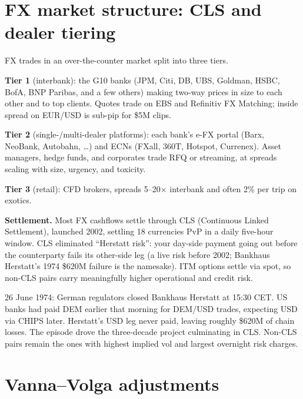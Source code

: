 \section{FX market structure: CLS and dealer tiering}
\label{sec:fx_market_structure}

FX trades in an over-the-counter market split into three tiers.

\textbf{Tier 1} (interbank): the G10 banks (JPM, Citi, DB, UBS,
Goldman, HSBC, BofA, BNP Paribas, and a few others) making two-way
prices in size to each other and to top clients.  Quotes trade on
EBS and Refinitiv FX Matching; inside spread on EUR/USD is sub-pip
for \$5M clips.

\textbf{Tier 2} (single-/multi-dealer platforms): each bank's
e-FX portal (Barx, NeoBank, Autobahn, \ldots) and ECNs (FXall, 360T,
Hotspot, Currenex).  Asset managers, hedge funds, and corporates
trade RFQ or streaming, at spreads scaling with size, urgency, and
toxicity.

\textbf{Tier 3} (retail): CFD brokers, spreads 5--20$\times$
interbank and often 2\% per trip on exotics.

\textbf{Settlement.}  Most FX cashflows settle through CLS
(Continuous Linked Settlement), launched 2002, settling 18
currencies PvP in a daily five-hour window.  CLS eliminated
``Herstatt risk'': your day-side payment going out before the
counterparty fails its other-side leg (a live risk before 2002;
Bankhaus Herstatt's 1974 \$620M failure is the namesake).  ITM
options settle via spot, so non-CLS pairs carry meaningfully higher
operational and credit risk.

\begin{historybox}[title={Herstatt and the birth of CLS}]
26 June 1974: German regulators closed Bankhaus Herstatt at 15:30
CET.  US banks had paid DEM earlier that morning for DEM/USD trades,
expecting USD via CHIPS later.  Herstatt's USD leg never paid,
leaving roughly \$620M of chain losses.  The episode drove the
three-decade project culminating in CLS.  Non-CLS pairs remain
the ones with highest implied vol and largest overnight risk
charges.
\end{historybox}

\section{Vanna--Volga adjustments}
\label{sec:vanna_volga}

